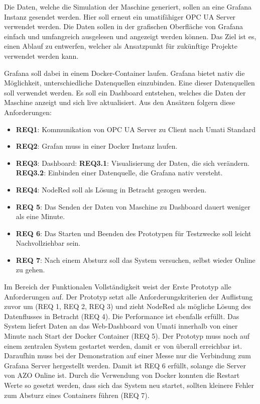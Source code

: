 \documentclass[a4paper, 12pt, oneside, toc=listofnumbered, bibliography=totoc]{scrbook}
\begin{document}
		Die Daten, welche die Simulation der Maschine generiert, sollen an eine Grafana Instanz gesendet werden. Hier soll erneut ein umatifähiger OPC UA Server verwendet werden. Die Daten sollen in der grafischen Oberfläche von Grafana einfach und umfangreich ausgelesen und angezeigt werden können. Das Ziel ist es, einen Ablauf zu entwerfen, welcher als Ansatzpunkt für zukünftige Projekte verwendet werden kann. 
		
		Grafana soll dabei in einem Docker-Container laufen. Grafana bietet nativ die Möglichkeit, unterschiedliche Datenquellen einzubinden. Eine dieser Datenquellen soll verwendet werden. Es soll ein Dashboard entstehen, welches die Daten der Maschine anzeigt und sich live aktualisiert. Aus den Ansätzen folgern diese Anforderungen:
		
		\begin{itemize}
			\item \textbf{REQ1}: Kommunikation von OPC UA Server zu Client nach Umati Standard
			\item \textbf{REQ2}: Grafan muss in einer Docker Instanz laufen.
			\item \textbf{REQ3}: Dashboard:
			\subitem \textbf{REQ3.1}: Visualisierung der Daten, die sich verändern.
			\subitem \textbf{REQ3.2}: Einbinden einer Datenquelle, die Grafana nativ versteht.
			\item \textbf{REQ4}: NodeRed soll als Lösung in Betracht gezogen werden.
			
			\item \textbf{REQ 5}: Das Senden der Daten von Maschine zu Dashboard dauert weniger als eine Minute.
			
			\item \textbf{REQ 6}: Das Starten und Beenden des Prototypen für Testzwecke soll leicht Nachvollziehbar sein. 
			
			\item \textbf{REQ 7}: Nach einem Absturz soll das System versuchen, selbst wieder Online zu gehen. 
		\end{itemize}
	
		Im Bereich der Funktionalen Vollständigkeit weist der Erste Prototyp alle Anforderungen auf. Der Prototyp setzt alle Anforderungskriterien der Auflistung zuvor um (REQ 1, REQ 2, REQ 3) und zieht NodeRed als mögliche Lösung des Datenflusses in Betracht (REQ 4). Die Performance ist ebenfalls erfüllt. Das System liefert Daten an das Web-Dashboard von Umati innerhalb von einer Minute nach Start der Docker Container (REQ 5). Der Prototyp muss noch auf einem zentralen System gestartet werden, damit er von überall erreichbar ist. Daraufhin muss bei der Demonstration auf einer Messe nur die Verbindung zum Grafana Server hergestellt werden. Damit ist REQ 6 erfüllt, solange die Server von AZO Online ist. Durch die Verwendung von Docker konnten die Restart Werte so gesetzt werden, dass sich das System neu startet, sollten kleinere Fehler zum Absturz eines Containers führen (REQ 7).
		
\end{document}

